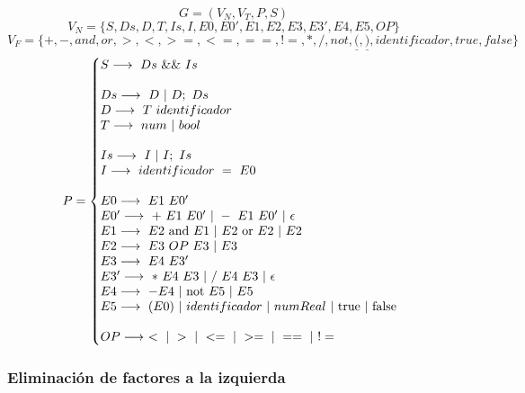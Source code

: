 $$G = (V_N, V_T, P, S)$$
$$V_N = \{S, Ds, D, T, Is, I, E0, E0', E1, E2, E3, E3', E4, E5, OP\}$$
$$V_F = \{+, -, and, or, >, <, >=, <=, ==, !=, *, /, not, \underline{(}, \underline{)}, identificador, true, false\}$$
\begin{equation*}P =\left\{
\begin{array}{@{}ll@{}}
S \longrightarrow\ Ds\ \&\&\ Is\\
\\
Ds \longrightarrow\ D\ |\ D;\ Ds\\
D \longrightarrow\ T\ identificador\\
T \longrightarrow\ num\ |\ bool\\
\\
Is \longrightarrow\ I\ |\ I;\ Is\\
I \longrightarrow\ identificador\ =\ E0\\
\\
E0 \longrightarrow\ E1\ E0'\\
E0' \longrightarrow\ +\ E1\ E0'\ |\ -\ E1\ E0'\ |\ \epsilon\\
E1 \longrightarrow\ E2\ \text{and}\ E1\ |\ E2\ \text{or}\ E2\ |\ E2\\
E2 \longrightarrow\ E3\ OP\ E3\ |\ E3\\
E3 \longrightarrow\ E4\ E3'\\
E3' \longrightarrow\ *\ E4\ E3\ |\ /\ E4\ E3\ |\ \epsilon\\
E4 \longrightarrow\ -E4\ |\ \text{not}\ E5\ |\ E5\\
E5 \longrightarrow\ (E0)\ |\ identificador\ |\ numReal\ |\ \text{true}\ |\ \text{false}\\
\\
OP \longrightarrow\ <\ |\ >\ |\ <=\ |\ >=\ |\ ==\ |\ !=\\
\end{array}
\right .
\end{equation*}

\newpage
\subsubsection{Eliminación de factores a la izquierda}

